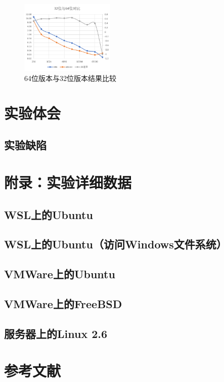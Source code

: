 \documentclass[a4paper,twoside]{article}
\begin{document}
\begin{spacing}{1.2}
\begin{figure}[htb]
	\centering
	\caption{64位版本与32位版本结果比较}
	\label{fig:64bit}
	\includegraphics[width=0.4\textwidth]{64bit.png}
\end{figure}



\section{实验体会}

\subsection{实验缺陷}

\clearpage
\section*{附录：实验详细数据}
\label{sec:appendix}

\subsection{WSL上的Ubuntu}

\subsection{WSL上的Ubuntu（访问Windows文件系统）}

\subsection{VMWare上的Ubuntu}

\subsection{VMWare上的FreeBSD}

\subsection{服务器上的Linux 2.6}


\clearpage
\section*{参考文献}




\end{spacing}
\end{document}
